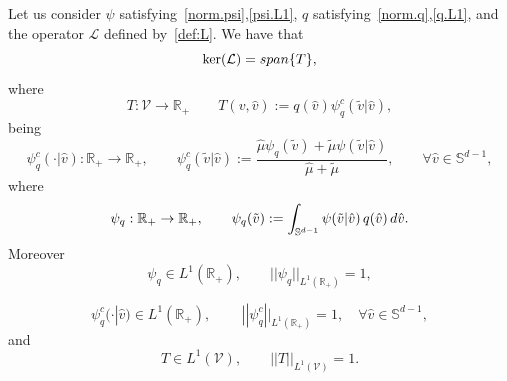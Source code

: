 \documentclass[10pt,a4paper]{amsart}
\newcommand{\R}{\mathbb{R}}
\newcommand{\hmu}{\hat{\mu}}
\newcommand{\hv}{\hat{v}}
\newcommand{\intS}{\int_{\mathbb{S}^{d-1}}}
\newcommand{\tmu}{\tilde{\mu}}
\newcommand{\tv}{\tilde{v}}
\begin{document}
\begin{proposition}\label{prop.1}
Let us consider $\psi$ satisfying~\eqref{norm.psi},\eqref{psi.L1}, $q$ satisfying~\eqref{norm.q},\eqref{q.L1}, and the operator $\mathcal{L}$ defined by~\eqref{def:L}. We have that
\[
\ker(\mathcal{L})= {\rm span}\lbrace T\rbrace,
\]
where
\begin{equation}\label{def:T}
    T: \mathcal{V}\to \R_+ \qquad T(v,\hv):= q(\hv) \psi_q^c(\tv|\hv),
\end{equation}
being
\begin{equation}\label{def:psiqc}
    \psi_q^c(\cdot|\hv):\R_+ \to\R_+, \qquad \psi_q^c(\tv|\hv) := \dfrac{\hmu \psi_q(\tv)+\tmu\psi(\tv|\hv)}{\hmu+\tmu}, \qquad \forall \hv \in \mathbb{S}^{d-1},
\end{equation}
where
\begin{equation*}\label{def:psiq}
    \psi_q:\R_+\to \R_+, \qquad \psi_q(\tv):=\intS \psi(\tv|\hv) \, q(\hv) \, {\rm d} \hv.
\end{equation*}
Moreover
\begin{equation}\label{norm.psiq}
\psi_q \in L^1(\R_+), \qquad ||\psi_q||_{L^1(\R_+)}=1,    
\end{equation}

\begin{equation}\label{norm.psiqc}
 \psi_q^c(\cdot| \hv) \in L^1(\R_+), \,  \qquad ||\psi_q^c||_{L^1(\R_+)}=1, \quad \forall \hv \in \mathbb{S}^{d-1},
\end{equation}
and
\begin{equation}\label{norm.T}
T\in L^1(\mathcal{V}), \qquad ||T||_{L^1(\mathcal{V})}=1.    
\end{equation}
\end{proposition}
\end{document}
